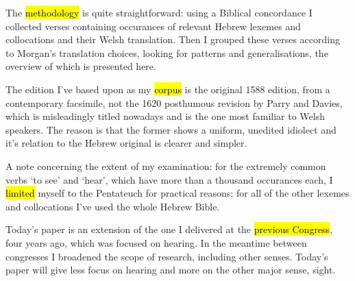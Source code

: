 \begin{paper}
	{\click} The \hl{methodology} is quite straightforward:  using a Biblical concordance I collected verses containing occurances of relevant Hebrew lexemes and collocations and their Welsh translation.  Then I grouped these verses according to Morgan’s translation choices,  looking for patterns and generalisations, the overview of which is presented here.

	\begin{leftbar}
		{\click} The edition I’ve based upon as my \hl{corpus} is the original 1588 edition, from a contemporary facsimile, not the 1620 posthumous revision by Parry and Davies, which is misleadingly titled  nowadays and is the one most familiar to Welsh speakers. The reason is that the former shows a uniform, unedited idiolect and it’s relation to the Hebrew original is clearer and simpler.
	\end{leftbar}

	\begin{leftbar}
		{\click} A note concerning the extent of my examination: for the extremely common verbs  ‘to see’ and  ‘hear’, which have more than a thousand occurances each, I \hl{limited} myself to the Pentateuch for practical reasons; for all of the other lexemes and collocations I’ve used the whole Hebrew Bible.
	\end{leftbar}

	{\click} Today’s paper is an extension of the one I delivered at the \hl{previous Congress}, four years ago, which was focused on hearing. In the meantime between congresses I broadened the scope of research, including other senses. Today’s paper will give less focus on hearing and more on the other major sense, sight.
\end{paper}
